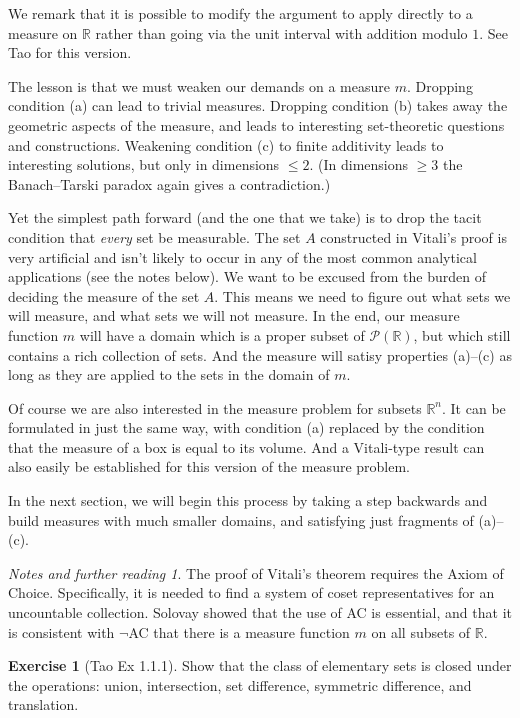 \documentclass[11pt,oneside]{amsbook}
\newcommand{\RR}{{\mathbb R}}
\theoremstyle{definition}
\newtheorem{exerc}{Exercise}[section]
\theoremstyle{plain}
\theoremstyle{definition}
\theoremstyle{remark}
\newtheorem*{notes}{Notes and further reading}
\numberwithin{equation}{section}
\numberwithin{figure}{section}
\begin{document}
We remark that it is possible to modify the argument to apply directly to a measure on $\RR$ rather than going via the unit interval with addition modulo $1$. See Tao for this version.

The lesson is that we must weaken our demands on a measure $m$. Dropping condition (a) can lead to trivial measures. Dropping condition (b) takes away the geometric aspects of the measure, and leads to interesting set-theoretic questions and constructions. Weakening condition (c) to finite additivity leads to interesting solutions, but only in dimensions $\leq2$. (In dimensions $\geq3$ the Banach--Tarski paradox again gives a contradiction.)

Yet the simplest path forward (and the one that we take) is to drop the tacit condition that \emph{every} set be measurable. The set $A$ constructed in Vitali's proof is very artificial and isn't likely to occur in any of the most common analytical applications (see the notes below). We want to be excused from the burden of deciding the measure of the set $A$. This means we need to figure out what sets we will measure, and what sets we will not measure. In the end, our measure function $m$ will have a domain which is a proper subset of $\mathcal P(\RR)$, but which still contains a rich collection of sets. And the measure will satisy properties (a)--(c) as long as they are applied to the sets in the domain of $m$.

Of course we are also interested in the measure problem for subsets $\RR^n$. It can be formulated in just the same way, with condition (a) replaced by the condition that the measure of a box is equal to its volume. And a Vitali-type result can also easily be established for this version of the measure problem.

In the next section, we will begin this process by taking a step backwards and build measures with much smaller domains, and satisfying just fragments of (a)--(c).

\begin{notes}
  The proof of Vitali's theorem requires the Axiom of Choice. Specifically, it is needed to find a system of coset representatives for an uncountable collection. Solovay showed that the use of AC is essential, and that it is consistent with $\neg$AC that there is a measure function $m$ on all subsets of $\RR$.
\end{notes}

\begin{exerc}[Tao Ex 1.1.1]
  Show that the class of elementary sets is closed under the operations: union, intersection, set difference, symmetric difference, and translation.
\end{exerc}
\end{document}
